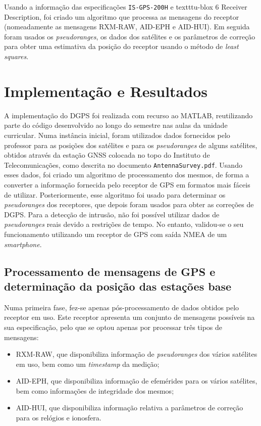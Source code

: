 \documentclass{article}
\begin{document}
Usando a informação das especificações \texttt{IS-GPS-200H} e texttt{u-blox 6 Receiver Description}, foi criado um algoritmo que processa as mensagens do receptor (nomeadamente as mensagens RXM-RAW, AID-EPH e AID-HUI). Em seguida foram usados os \textit{pseudoranges}, os dados dos satélites e os parâmetros de correção para obter uma estimativa da posição do receptor usando o método de \textit{least squares}.

\section{Implementação e Resultados}

A implementação do DGPS foi realizada com recurso ao MATLAB,
reutilizando parte do código desenvolvido ao longo do semestre nas
aulas da unidade curricular. Numa instância inicial, foram
utilizados dados fornecidos pelo professor para as posições dos
satélites e para os \textit{pseudoranges} de alguns satélites,
obtidos através da estação GNSS colocada no topo do Instituto de
Telecomunicações, como descrita no documento
\texttt{AntennaSurvey.pdf}. Usando esses dados, foi criado um algoritmo de processamento dos mesmos, de forma a converter a informação fornecida pelo receptor de GPS em formatos mais fáceis de utilizar. Posteriormente, esse algoritmo foi usado para determinar os \textit{pseudoranges} dos receptores, que depois foram usados para obter as correções de DGPS. Para a detecção de intrusão, não foi possível utilizar dados de \textit{pseudoranges} reais devido a restrições de tempo. No entanto, validou-se o seu funcionamento utilizando um receptor de GPS com saída NMEA de um \textit{smartphone}.

\subsection{Processamento de mensagens de GPS e determinação da posição das estações base}

Numa primeira fase, fez-se apenas pós-processamento de dados obtidos pelo receptor em uso.  Este receptor apresenta um conjunto de mensagens possíveis na sua especificação, pelo que se optou apenas por processar três tipos de mensagens: 
\begin{itemize}
  \item RXM-RAW, que disponibiliza informação de \textit{pseudoranges} dos vários satélites em uso, bem como um \textit{timestamp} da medição;
  \item AID-EPH, que disponibiliza informação de efemérides para os vários satélites, bem como informações de integridade dos mesmos;
  \item AID-HUI, que disponibiliza informação relativa a parâmetros de correção para os relógios e ionosfera.
\end{itemize}
\end{document}
